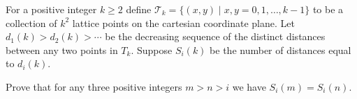 For a positive integer $k\ge 2$ define $\mathcal{T}_k=\{(x,y)\mid x,y=0,1,\ldots, k-1\}$ to be a collection of $k^2$ lattice points on the cartesian  coordinate plane. Let $d_1(k)>d_2(k)>\cdots$ be the decreasing sequence of the distinct distances between any two points in $T_k$. Suppose $S_i(k)$ be the number of distances equal to $d_i(k)$.

Prove that for any three positive integers $m>n>i$ we have $S_i(m)=S_i(n)$.